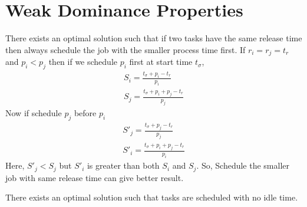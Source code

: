 \documentclass[11pt, conference, onecolumn]{IEEEtran}
\begin{document}
\section{Weak Dominance Properties}

There exists an optimal solution such that if two tasks have the same release time then always schedule the job with the smaller process time first. If $r_i=r_j=t_r$ and $p_i<p_j$ then if we schedule
$p_i$ first at start time $t_{\sigma}$, 
\begin{equation}
\begin{array}{l}
S_{i} = \frac{t_{\sigma} + p_i - t_r}{p_i} \\
S_{j} = \frac{t_{\sigma} + p_i + p_j- t_r}{p_j} 
\end{array}
\end{equation}
Now if schedule $p_j$ before $p_i$
\begin{equation}
\begin{array}{l}
S'_{j} = \frac{t_{\sigma} + p_j - t_r}{p_j} \\
S'_{i} = \frac{t_{\sigma} + p_i + p_j- t_r}{p_i} 
\end{array}
\end{equation}
Here, $S'_{j} < S_{j}$ but $S'_{i}$ is greater than both $S_{i}$ and $S_{j}$. So, Schedule the smaller job with 
same release time can give better result.

There exists an optimal solution such that tasks are scheduled with no idle time.
\end{document}
